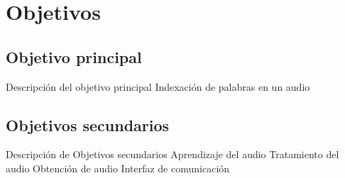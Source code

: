 \documentclass[../main.tex]{subfiles}
\begin{document}
\chapter{Objetivos}\label{ch:objetivos}
\section{Objetivo principal}\label{sec:obj_principal}
Descripción del objetivo principal
Indexación de palabras en un audio

\section{Objetivos secundarios}\label{sec:obj_secundarios}
Descripción de Objetivos secundarios
Aprendizaje del audio
Tratamiento del audio
Obtención de audio
Interfaz de comunicación
\end{document}
